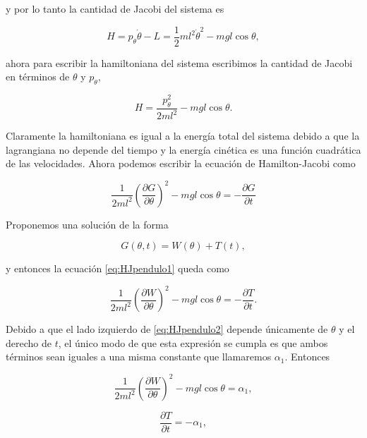 \documentclass[a4paper,10pt]{article}
\numberwithin{equation}{section}
\begin{document}
y por lo tanto la cantidad de Jacobi del sistema es 

\begin{equation}
 H = p_\theta \dot{\theta} - L = \frac{1}{2}ml^2\dot{\theta}^2 - mgl\cos{\theta},
\end{equation}

ahora para escribir la hamiltoniana del sistema escribimos la cantidad de Jacobi 
en términos de $\theta$ y $p_\theta$, 

\begin{equation}
 H = \frac{p_\theta^2}{2ml^2} - mgl\cos{\theta}.
\end{equation}

Claramente la hamiltoniana es igual a la energía total del sistema debido a que 
la lagrangiana no depende del tiempo y la energía cinética es una función cuadrática 
de las velocidades. Ahora podemos escribir la ecuación de Hamilton-Jacobi como 

\begin{equation}
 \frac{1}{2ml^2} \left(\frac{\partial G}{\partial \theta} \right)^2 - mgl\cos{\theta} 
 = - \frac{\partial G}{\partial t}
 \label{eq:HJpendulo1}
\end{equation}

Proponemos una solución de la forma 

\begin{equation}
 G(\theta,t) = W(\theta) + T(t),
\end{equation}

y entonces la ecuación \eqref{eq:HJpendulo1} queda como 

\begin{equation}
  \frac{1}{2ml^2} \left(\frac{\partial W}{\partial \theta} \right)^2 - mgl\cos{\theta} 
 = - \frac{\partial T}{\partial t}.
 \label{eq:HJpendulo2}
\end{equation}

Debido a que el lado izquierdo de \eqref{eq:HJpendulo2} depende únicamente de $\theta$ 
y el derecho de $t$, el único  modo de que esta expresión se cumpla es que ambos
términos sean iguales a una misma constante que llamaremos $\alpha_1$. Entonces 

\begin{equation}
 \frac{1}{2ml^2} \left(\frac{\partial W}{\partial \theta} \right)^2 - mgl\cos{\theta} = 
 \alpha_1,
 \label{eq:HJpendulo3}
\end{equation}

\begin{equation}
 \frac{\partial T}{\partial t} = - \alpha_1,
\end{equation}
\end{document}
